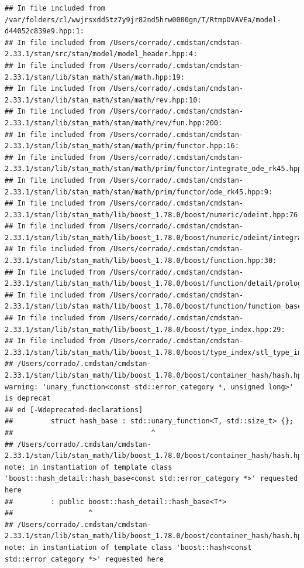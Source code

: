 \documentclass[
]{article}
\begin{document}
\begin{verbatim}
## In file included from /var/folders/cl/wwjrsxdd5tz7y9jr82nd5hrw0000gn/T/RtmpDVAVEa/model-d44052c839e9.hpp:1:
## In file included from /Users/corrado/.cmdstan/cmdstan-2.33.1/stan/src/stan/model/model_header.hpp:4:
## In file included from /Users/corrado/.cmdstan/cmdstan-2.33.1/stan/lib/stan_math/stan/math.hpp:19:
## In file included from /Users/corrado/.cmdstan/cmdstan-2.33.1/stan/lib/stan_math/stan/math/rev.hpp:10:
## In file included from /Users/corrado/.cmdstan/cmdstan-2.33.1/stan/lib/stan_math/stan/math/rev/fun.hpp:200:
## In file included from /Users/corrado/.cmdstan/cmdstan-2.33.1/stan/lib/stan_math/stan/math/prim/functor.hpp:16:
## In file included from /Users/corrado/.cmdstan/cmdstan-2.33.1/stan/lib/stan_math/stan/math/prim/functor/integrate_ode_rk45.hpp:6:
## In file included from /Users/corrado/.cmdstan/cmdstan-2.33.1/stan/lib/stan_math/stan/math/prim/functor/ode_rk45.hpp:9:
## In file included from /Users/corrado/.cmdstan/cmdstan-2.33.1/stan/lib/stan_math/lib/boost_1.78.0/boost/numeric/odeint.hpp:76:
## In file included from /Users/corrado/.cmdstan/cmdstan-2.33.1/stan/lib/stan_math/lib/boost_1.78.0/boost/numeric/odeint/integrate/observer_collection.hpp:23:
## In file included from /Users/corrado/.cmdstan/cmdstan-2.33.1/stan/lib/stan_math/lib/boost_1.78.0/boost/function.hpp:30:
## In file included from /Users/corrado/.cmdstan/cmdstan-2.33.1/stan/lib/stan_math/lib/boost_1.78.0/boost/function/detail/prologue.hpp:17:
## In file included from /Users/corrado/.cmdstan/cmdstan-2.33.1/stan/lib/stan_math/lib/boost_1.78.0/boost/function/function_base.hpp:21:
## In file included from /Users/corrado/.cmdstan/cmdstan-2.33.1/stan/lib/stan_math/lib/boost_1.78.0/boost/type_index.hpp:29:
## In file included from /Users/corrado/.cmdstan/cmdstan-2.33.1/stan/lib/stan_math/lib/boost_1.78.0/boost/type_index/stl_type_index.hpp:47:
## /Users/corrado/.cmdstan/cmdstan-2.33.1/stan/lib/stan_math/lib/boost_1.78.0/boost/container_hash/hash.hpp:132:33: warning: 'unary_function<const std::error_category *, unsigned long>' is deprecat
## ed [-Wdeprecated-declarations]
##         struct hash_base : std::unary_function<T, std::size_t> {};
##                                 ^
## /Users/corrado/.cmdstan/cmdstan-2.33.1/stan/lib/stan_math/lib/boost_1.78.0/boost/container_hash/hash.hpp:692:18: note: in instantiation of template class 'boost::hash_detail::hash_base<const std::error_category *>' requested here
##         : public boost::hash_detail::hash_base<T*>
##                  ^
## /Users/corrado/.cmdstan/cmdstan-2.33.1/stan/lib/stan_math/lib/boost_1.78.0/boost/container_hash/hash.hpp:420:24: note: in instantiation of template class 'boost::hash<const std::error_category *>' requested here

\end{verbatim}
\end{document}
